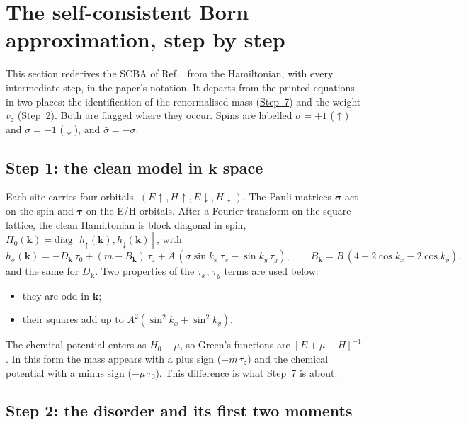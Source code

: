 \documentclass[11pt,a4paper]{article}
\newcommand{\up}{{\uparrow}}
\newcommand{\dn}{{\downarrow}}
\begin{document}
\section{The self-consistent Born approximation, step by step}\label{s:derivation}

This section rederives the SCBA of Ref.~\cite{g2g1} from the Hamiltonian, with every
intermediate step, in the paper's notation. It departs from the printed equations in two places:
the identification of the renormalised mass (\hyperref[st:identify]{Step~7}) and the weight $v_z$
(\hyperref[st:disorder]{Step~2}). Both are flagged where they occur. Spins are labelled $\sigma=+1$ ($\up$)
and $\sigma=-1$ ($\dn$), and $\bar\sigma=-\sigma$.

\subsection{Step 1: the clean model in \texorpdfstring{$\bm k$}{k} space}\label{st:clean}

Each site carries four orbitals, $(E\up, H\up, E\dn, H\dn)$. The Pauli matrices $\bm\sigma$ act on
the spin and $\bm\tau$ on the E/H orbitals. After a Fourier transform on the square lattice, the
clean Hamiltonian is block diagonal in spin, $H_0(\bm k)=\mathrm{diag}[h_\up(\bm k),h_\dn(\bm k)]$, with
\begin{equation}
h_\sigma(\bm k) = -D_{\bm k}\,\tau_0 + (m-B_{\bm k})\,\tau_z + A\,(\sigma\sin k_x\,\tau_x - \sin k_y\,\tau_y),
\qquad B_{\bm k}=B\,(4-2\cos k_x-2\cos k_y),
\label{e:hk}
\end{equation}
and the same for $D_{\bm k}$. Two properties of the $\tau_x$, $\tau_y$ terms are used below:
\begin{itemize}
\item they are odd in $\bm k$;
\item their squares add up to $A^2(\sin^2k_x+\sin^2k_y)$.
\end{itemize}
The chemical potential enters as $H_0-\mu$, so Green's functions are $[E+\mu-H]^{-1}$. In this
form the mass appears with a plus sign ($+m\,\tau_z$) and the chemical potential with a minus
sign ($-\mu\,\tau_0$). This difference is what \hyperref[st:identify]{Step~7} is about.

\subsection{Step 2: the disorder and its first two moments}\label{st:disorder}
\end{document}
